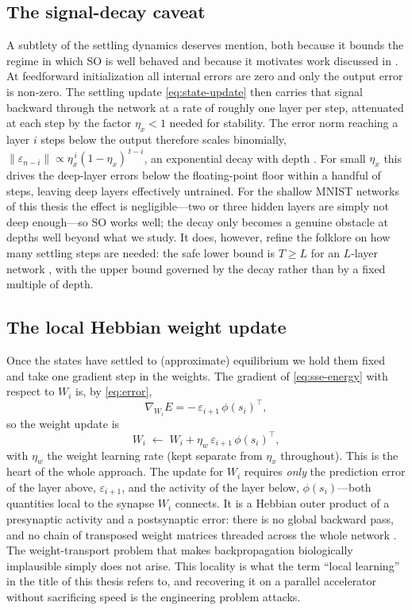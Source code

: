 \subsection{The signal-decay caveat}

A subtlety of the settling dynamics deserves mention, both because it bounds the regime in which
SO is well behaved and because it motivates work discussed in . At feedforward
initialization all internal errors are zero and only the output error is non-zero. The settling
update \cref{eq:state-update} then carries that signal backward through the network at a rate of
roughly one layer per step, attenuated at each step by the factor $\eta_x < 1$ needed for
stability. The error norm reaching a layer $i$ steps below the output therefore scales
binomially, $\lVert\varepsilon_{n-i}\rVert \propto \eta_x^{\,i}(1-\eta_x)^{\,t-i}$, an exponential
decay with depth \citep{goemaere2025epc}. For small $\eta_x$ this drives the deep-layer errors
below the floating-point floor within a handful of steps, leaving deep layers effectively
untrained. For the shallow MNIST networks of this thesis the effect is negligible---two or three
hidden layers are simply not deep enough---so SO works well; the decay only becomes a genuine
obstacle at depths well beyond what we study. It does, however, refine the folklore on how many
settling steps are needed: the safe lower bound is $T \ge L$ for an $L$-layer network
\citep{qi2025settling}, with the upper bound governed by the decay rather than by a fixed multiple
of depth.

\subsection{The local Hebbian weight update}

Once the states have settled to (approximate) equilibrium we hold them fixed and take one gradient
step in the weights. The gradient of \cref{eq:sse-energy} with respect to $W_i$ is, by
\cref{eq:error},
\begin{equation}
  \nabla_{W_i} E = -\,\varepsilon_{i+1}\,\phi(s_i)^\top ,
\end{equation}
so the weight update is
\begin{equation}
  W_i \;\leftarrow\; W_i + \eta_w\,\varepsilon_{i+1}\,\phi(s_i)^\top ,
  \label{eq:weight-update}
\end{equation}
with $\eta_w$ the weight learning rate (kept separate from $\eta_x$ throughout). This is the heart
of the whole approach. The update for $W_i$ requires \emph{only} the prediction error of the layer
above, $\varepsilon_{i+1}$, and the activity of the layer below, $\phi(s_i)$---both quantities
local to the synapse $W_i$ connects. It is a Hebbian outer product of a presynaptic activity and a
postsynaptic error: there is no global backward pass, and no chain of transposed weight matrices
threaded across the whole network \citep{whittington2017approximation,bogacz2017tutorial}. The
weight-transport problem that makes backpropagation biologically implausible simply does not
arise. This locality is what the term ``local learning'' in the title of this thesis refers to,
and recovering it on a parallel accelerator without sacrificing speed is the engineering problem
 attacks.

